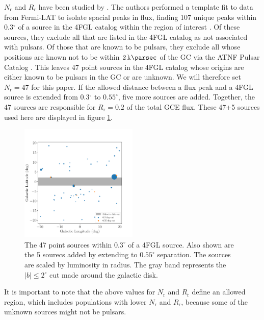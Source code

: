 \documentclass[a4paper,11pt]{article}
\newcommand{\comment}[1]{\emph{\color{red}{#1}}}
\begin{document}
$N_\text{r}$ and $R_\text{r}$ have been studied by \comment{Some technical name for the Fermilab team.} \cite{Zhong:2019ycb}. The authors performed a template fit to data from Fermi-LAT to isolate spacial peaks in flux, finding 107 unique peaks within 0.3$^\circ$ of a source in the 4FGL catalog within the region of interest \cite{Abdollahi_2020}. Of these sources, they exclude all that are listed in the 4FGL catalog as not associated with pulsars. Of those that are known to be pulsars, they exclude all whose positions are known not to be within $\SI{2}{\kilo\parsec}$ of the GC via the ATNF Pulsar Catalog \cite{Hobbs04}. This leaves 47 point sources in the 4FGL catalog whose origins are either known to be pulsars in the GC or are unknown. We will therefore set $N_\text{r} = 47$ for this paper. If the allowed distance between a flux peak and a 4FGL source is extended from 0.3$^\circ$ to $0.55^\circ$, five more sources are added. Together, the 47 sources are responsible for $R_\text{r}=0.2$ of the total GCE flux. \comment{Shouldn't I actually redo this addition given the fact that I'm now not using the same GCE flux as Fermilab?} These 47+5 sources used here are displayed in figure \ref{fig:47-sources}.

\begin{figure}
    \centering
    \includegraphics[width=0.5\textwidth]{figs/point-source-positions.pdf}
    \caption{The 47 point sources within $0.3^\circ$ of a 4FGL source. Also shown are the 5 sourecs added by extending to $0.55^\circ$ separation. The sources are scaled by luminosity in radius. The gray band represents the $|b| \leq 2^\circ$ cut made around the galactic disk. \comment{I think this disagrees with the Fermilab paper}}
    \label{fig:47-sources}
\end{figure}

It is important to note that the above values for $N_\text{r}$ and $R_\text{r}$ define an allowed region, which includes populations with lower $N_\text{r}$ and $R_\text{r}$, because some of the unknown sources might not be pulsars.
\end{document}
